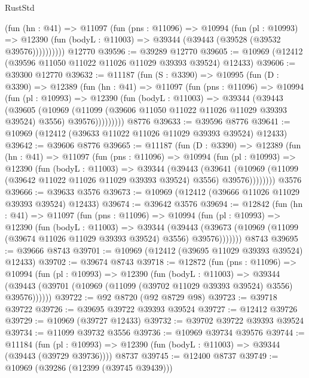 \begin{lexlean}{RustStd}
\begin{coremodule}
          (fun (hn : @41) =>
          @11097
            (fun (pns : @11096) =>
            @10994
              (fun (pl : @10993) =>
              @12390 (fun (bodyL : @11003) => @39344 (@39443 (@39528 (@39532 @39576))))))))))
    @12770
@39596 := @39289 @12770
@39605 := @10969 (@12412 (@39596 @11050 @11022 @11026 @11029 @39393 @39524) @12433)
@39606 := @39300 @12770
@39632 := @11187
    (fun (S : @3390) =>
    @10995
      (fun (D : @3390) =>
      @12389
        (fun (hn : @41) =>
        @11097
          (fun (pns : @11096) =>
          @10994
            (fun (pl : @10993) =>
            @12390
              (fun (bodyL : @11003) =>
              @39344
                (@39443
                  (@39605
                    (@10969
                      (@11099 (@39606 @11050 @11022 @11026 @11029 @39393 @39524) @3556)
                      @39576)))))))))
    @8776
@39633 := @39596 @8776
@39641 := @10969 (@12412 (@39633 @11022 @11026 @11029 @39393 @39524) @12433)
@39642 := @39606 @8776
@39665 := @11187
    (fun (D : @3390) =>
    @12389
      (fun (hn : @41) =>
      @11097
        (fun (pns : @11096) =>
        @10994
          (fun (pl : @10993) =>
          @12390
            (fun (bodyL : @11003) =>
            @39344
              (@39443
                (@39641
                  (@10969 (@11099 (@39642 @11022 @11026 @11029 @39393 @39524) @3556) @39576))))))))
    @3576
@39666 := @39633 @3576
@39673 := @10969 (@12412 (@39666 @11026 @11029 @39393 @39524) @12433)
@39674 := @39642 @3576
@39694 := @12842
    (fun (hn : @41) =>
    @11097
      (fun (pns : @11096) =>
      @10994
        (fun (pl : @10993) =>
        @12390
          (fun (bodyL : @11003) =>
          @39344
            (@39443
              (@39673 (@10969 (@11099 (@39674 @11026 @11029 @39393 @39524) @3556) @39576)))))))
    @8743
@39695 := @39666 @8743
@39701 := @10969 (@12412 (@39695 @11029 @39393 @39524) @12433)
@39702 := @39674 @8743
@39718 := @12872
    (fun (pns : @11096) =>
    @10994
      (fun (pl : @10993) =>
      @12390
        (fun (bodyL : @11003) =>
        @39344 (@39443 (@39701 (@10969 (@11099 (@39702 @11029 @39393 @39524) @3556) @39576))))))
@39722 := @92 @8720 (@92 @8729 @98)
@39723 := @39718 @39722
@39726 := @39695 @39722 @39393 @39524
@39727 := @12412 @39726
@39729 := @10969 (@39727 @12433)
@39732 := @39702 @39722 @39393 @39524
@39734 := @11099 @39732 @3556
@39736 := @10969 @39734 @39576
@39744 := @11184
    (fun (pl : @10993) => @12390 (fun (bodyL : @11003) => @39344 (@39443 (@39729 @39736))))
    @8737
@39745 := @12400 @8737
@39749 := @10969 (@39286 (@12399 (@39745 @39439)))

\end{coremodule}
\end{lexlean}
